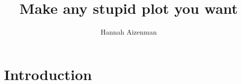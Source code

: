 \documentclass[letterpaper,onecolumn,titlepage]{Ythesis}
\title{Make any stupid plot you want}
\author{Hannah Aizenman}
\begin{document}
\makefrontmatter

\section{Introduction}
\label{sec:introduction}


\printbibliography
\end{document}

